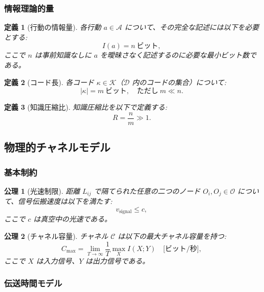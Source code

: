\documentclass[12pt,a4paper]{ltjsarticle}
\newtheorem{definition}{定義}
\newtheorem{axiom}{公理}
\begin{document}
	\subsubsection{情報理論的量}
	
	\begin{definition}[行動の情報量]
		各行動 $a \in \mathcal{A}$ について、その完全な記述には以下を必要とする:
		\[
		I(a) = n \ \text{ビット},
		\]
		ここで $n$ は事前知識なしに $a$ を曖昧さなく記述するのに必要な最小ビット数である。
	\end{definition}
	
	\begin{definition}[コード長]
		各コード $\kappa \in \mathcal{K}$（$\mathcal{D}$ 内のコードの集合）について:
		\[
		|\kappa| = m \ \text{ビット}, \quad \text{ただし} \ m \ll n.
		\]
	\end{definition}
	
	\begin{definition}[知識圧縮比]
		知識圧縮比を以下で定義する:
		\[
		R = \frac{n}{m} \gg 1.
		\]
	\end{definition}
	
	\subsection{物理的チャネルモデル}
	\label{app:channel-model}
	
	\subsubsection{基本制約}
	
	\begin{axiom}[光速制限]
		距離 $L_{ij}$ で隔てられた任意の二つのノード $O_i, O_j \in \mathcal{O}$ について、信号伝搬速度は以下を満たす:
		\[
		v_{\text{signal}} \leq c,
		\]
		ここで $c$ は真空中の光速である。
	\end{axiom}
	
	\begin{axiom}[チャネル容量]
		チャネル $\mathcal{C}$ は以下の最大チャネル容量を持つ:
		\[
		C_{\text{max}} = \lim_{T \to \infty} \frac{1}{T} \max_{X} I(X; Y) \quad \text{[ビット/秒]},
		\]
		ここで $X$ は入力信号、$Y$ は出力信号である。
	\end{axiom}
	
	\subsubsection{伝送時間モデル}
	
\end{document}
